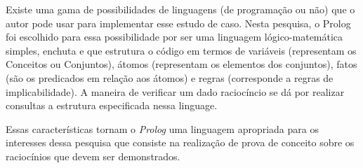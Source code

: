 Existe uma gama de possibilidades de linguagens (de programação ou não) que o autor pode usar para implementar esse estudo de caso. Nesta pesquisa, o Prolog foi escolhido para essa possibilidade por ser uma linguagem lógico-matemática simples, enchuta e que estrutura o código em termos de variáveis (representam os Conceitos ou Conjuntos), átomos (representam os elementos dos conjuntos),  fatos (são os predicados em relação aos átomos) e regras (corresponde a regras de implicabilidade). A maneira de verificar um dado raciocíncio se dá por realizar consultas a estrutura especificada nessa linguage. 

Essas características tornam o \textit{Prolog} uma linguagem apropriada para os interesses dessa pesquisa que consiste na realização de prova de conceito sobre os raciocínios que devem ser demonstrados. 
